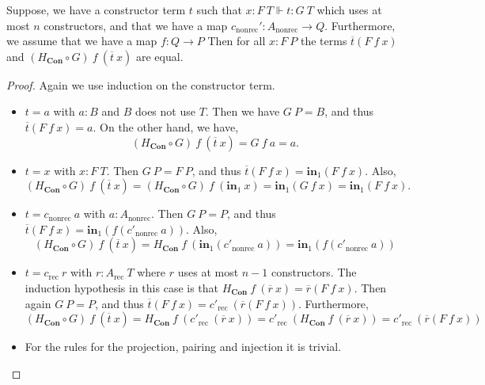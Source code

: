 \documentclass[a4paper,UKenglish]{lipics-v2016}
\newcommand{\Boperator}[1]{\mathrm{\mathbf{#1}}}
\newcommand{\inn}{\Boperator{in}}
\newcommand{\rec}[0]{\operatorname{rec}}
\newcommand{\nonrec}[0]{\operatorname{nonrec}}
\newcommand{\Con}[0]{\textbf{Con}}
\begin{document}
\begin{lemma}
\label{lem:constrCoh}
Suppose, we have a constructor term $t$ such that $x : F \> T \Vdash t : G \> T$ which uses at most $n$ constructors, and that we have a map $c_{\nonrec}' : A_{\nonrec} \rightarrow Q$.
Furthermore, we assume that we have a map $f : Q \rightarrow P$
Then for all $x : F \> P$ the terms $\overline{t}(F \> f \> x)$ and $(H_{\Con} \circ G) \> f \> (\overline{t} \> x)$ are equal.
\end{lemma}

\begin{proof}
Again we use induction on the constructor term.
\begin{itemize}
        \item $t = a$ with $a : B$ and $B$ does not use $T$. 
        Then we have $G \> P = B$, and thus 
        $
        \overline{t}(F \> f \> x) = a.
        $
        On the other hand, we have, 
        \[
        (H_{\Con} \circ G) \> f \> (\overline{t} \> x) = G \> f \> a = a.
        \]
        \item $t = x$ with $x : F \> T$. 
        Then $G \> P = F \> P$, and thus
        $
        \overline{t}(F \> f \> x) = \inn_1(F \> f \> x).
        $
        Also,
        \[
        (H_{\Con} \circ G) \> f \> (\overline{t} \> x) = (H_{\Con} \circ G) \> f \> (\inn_1 \> x) = \inn_1(G \> f \> x) = \inn_1(F \> f \> x).
        \]
        \item $t = c_{\nonrec} \> a$ with $a : A_{\nonrec}$. 
        Then $G \> P = P$, and thus
        $
        \overline{t}(F \> f \> x) = \inn_1(f(c'_{\nonrec} \> a))
        $.
        Also,
        \[
        (H_{\Con} \circ G) \> f \> (\overline{t} \> x) = H_{\Con} \> f \> (\inn_1(c'_{\nonrec} \> a)) = \inn_1(f(c'_{\nonrec} \> a))
        \]
        \item $t = c_{\rec} \> r$ with $r : A_{\rec} \> T$ where $r$ uses at most $n-1$ constructors. 
        The induction hypothesis in this case is that $H_{\Con} \> f \> (\overline{r} \> x) = \overline{r}(F \> f \> x)$.
        Then again $G \> P = P$, and thus
        $
        \overline{t}(F \> f \> x) = c'_{\rec} \> (\overline{r}(F \> f \> x))
        $.
        Furthermore,
        \[
        (H_{\Con} \circ G) \> f \> (\overline{t} \> x) = H_{\Con} \> f \> (c'_{\rec} \> (\overline{r} \> x)) = c'_{\rec} \> (H_{\Con} \> f \> (\overline{r} \> x)) = c'_{\rec} \> (\overline{r}(F \> f \> x))
        \]
        \item For the rules for the projection, pairing and injection it is trivial. \qedhere
\end{itemize}
\end{proof}
\end{document}
